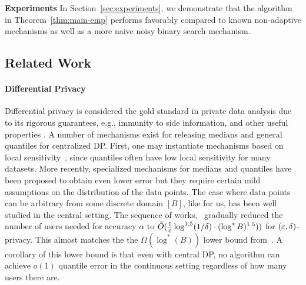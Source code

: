 %



%
%
%
%
%
%
%
%
%


%
%
%

\textbf{Experiments} In Section~\ref{sec:experiments}, we demonstrate that the algorithm in Theorem~\ref{thm:main-emp} performs favorably compared to known non-adaptive mechanisms as well as a more naive noisy binary search mechanism. 


\subsection{Related Work}\label{sec:prior-work}

\paragraph{Differential Privacy} Differential privacy is considered the gold standard in private data analysis due to its rigorous guarantees, e.g., immunity to side information, and other useful properties \cite{dwork2006calibrating, dwork2014algorithmic}. 
A number of mechanisms exist for releasing medians and general quantiles for centralized DP. First, one may instantiate mechanisms based on local sensitivity~\cite{nissim2007smooth, dwork2009differential, asi2020near}, since quantiles often have low local sensitivity for many datasets. More recently, specialized mechanisms for medians \cite{ tzamos2020optimal, drechsler2022nonparametric,aliakbarpour2023differentially} and quantiles \cite{wilson2019differentially, gillenwater2021differentially, alabi2022bounded} have been proposed to obtain even lower error but they require certain mild assumptions on the distribution of the data points.
%
The case where data points can be arbitrary from some discrete domain $[B]$, like for us, has been well studied in the central setting. The sequence of works,~\cite{BeimelNS16twotologstar,Bun2015logstar,Kaplan2020closinggap} gradually reduced the number of users needed for accuracy $\alpha$ to $\tilde O(\frac{1}{\varepsilon}\log^{1.5} (1/\delta)\cdot (\log^*B)^{1.5})
)$ for $(\varepsilon,\delta)$-privacy. This almost matches the the $\Omega(\log^*(B))$ lower bound from~\cite{AlonLMM19}. A corollary of this lower bound is that even with central DP, no algorithm can achieve $o(1)$ quantile error in the continuous setting regardless of how many users there are.
%
